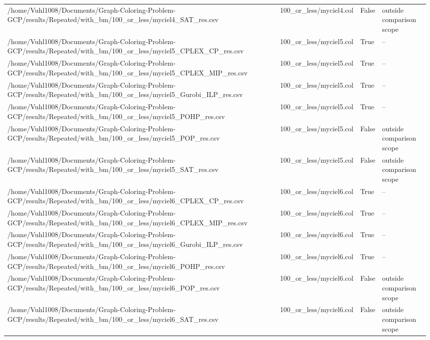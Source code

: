 \begin{table}[htbp]
\begin{tabular}{llll}
/home/Vuhl1008/Documents/Graph-Coloring-Problem-GCP/results/Repeated/with\_bm/100\_or\_less/myciel4\_SAT\_res.csv & 100\_or\_less/myciel4.col & False & outside comparison scope \\
/home/Vuhl1008/Documents/Graph-Coloring-Problem-GCP/results/Repeated/with\_bm/100\_or\_less/myciel5\_CPLEX\_CP\_res.csv & 100\_or\_less/myciel5.col & True & -- \\
/home/Vuhl1008/Documents/Graph-Coloring-Problem-GCP/results/Repeated/with\_bm/100\_or\_less/myciel5\_CPLEX\_MIP\_res.csv & 100\_or\_less/myciel5.col & True & -- \\
/home/Vuhl1008/Documents/Graph-Coloring-Problem-GCP/results/Repeated/with\_bm/100\_or\_less/myciel5\_Gurobi\_ILP\_res.csv & 100\_or\_less/myciel5.col & True & -- \\
/home/Vuhl1008/Documents/Graph-Coloring-Problem-GCP/results/Repeated/with\_bm/100\_or\_less/myciel5\_POHP\_res.csv & 100\_or\_less/myciel5.col & True & -- \\
/home/Vuhl1008/Documents/Graph-Coloring-Problem-GCP/results/Repeated/with\_bm/100\_or\_less/myciel5\_POP\_res.csv & 100\_or\_less/myciel5.col & False & outside comparison scope \\
/home/Vuhl1008/Documents/Graph-Coloring-Problem-GCP/results/Repeated/with\_bm/100\_or\_less/myciel5\_SAT\_res.csv & 100\_or\_less/myciel5.col & False & outside comparison scope \\
/home/Vuhl1008/Documents/Graph-Coloring-Problem-GCP/results/Repeated/with\_bm/100\_or\_less/myciel6\_CPLEX\_CP\_res.csv & 100\_or\_less/myciel6.col & True & -- \\
/home/Vuhl1008/Documents/Graph-Coloring-Problem-GCP/results/Repeated/with\_bm/100\_or\_less/myciel6\_CPLEX\_MIP\_res.csv & 100\_or\_less/myciel6.col & True & -- \\
/home/Vuhl1008/Documents/Graph-Coloring-Problem-GCP/results/Repeated/with\_bm/100\_or\_less/myciel6\_Gurobi\_ILP\_res.csv & 100\_or\_less/myciel6.col & True & -- \\
/home/Vuhl1008/Documents/Graph-Coloring-Problem-GCP/results/Repeated/with\_bm/100\_or\_less/myciel6\_POHP\_res.csv & 100\_or\_less/myciel6.col & True & -- \\
/home/Vuhl1008/Documents/Graph-Coloring-Problem-GCP/results/Repeated/with\_bm/100\_or\_less/myciel6\_POP\_res.csv & 100\_or\_less/myciel6.col & False & outside comparison scope \\
/home/Vuhl1008/Documents/Graph-Coloring-Problem-GCP/results/Repeated/with\_bm/100\_or\_less/myciel6\_SAT\_res.csv & 100\_or\_less/myciel6.col & False & outside comparison scope \\

\end{tabular}
\end{table}
